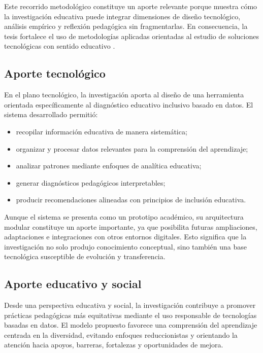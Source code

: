 \begin{refsection}
Este recorrido metodológico constituye un aporte relevante porque muestra cómo la investigación educativa puede integrar dimensiones de diseño tecnológico, análisis empírico y reflexión pedagógica sin fragmentarlas. En consecuencia, la tesis fortalece el uso de metodologías aplicadas orientadas al estudio de soluciones tecnológicas con sentido educativo \parencite{creswell2014}.

\subsection{Aporte tecnológico}

En el plano tecnológico, la investigación aporta al diseño de una herramienta orientada específicamente al diagnóstico educativo inclusivo basado en datos. El sistema desarrollado permitió:

\begin{itemize}
\item recopilar información educativa de manera sistemática;
\item organizar y procesar datos relevantes para la comprensión del aprendizaje;
\item analizar patrones mediante enfoques de analítica educativa;
\item generar diagnósticos pedagógicos interpretables;
\item producir recomendaciones alineadas con principios de inclusión educativa.
\end{itemize}

Aunque el sistema se presenta como un prototipo académico, su arquitectura modular constituye un aporte importante, ya que posibilita futuras ampliaciones, adaptaciones e integraciones con otros entornos digitales. Esto significa que la investigación no solo produjo conocimiento conceptual, sino también una base tecnológica susceptible de evolución y transferencia.

\subsection{Aporte educativo y social}

Desde una perspectiva educativa y social, la investigación contribuye a promover prácticas pedagógicas más equitativas mediante el uso responsable de tecnologías basadas en datos. El modelo propuesto favorece una comprensión del aprendizaje centrada en la diversidad, evitando enfoques reduccionistas y orientando la atención hacia apoyos, barreras, fortalezas y oportunidades de mejora.


\end{refsection}
